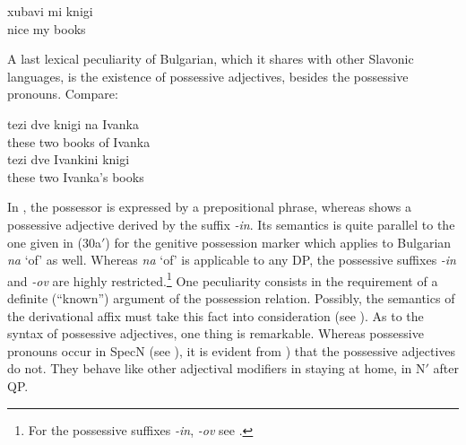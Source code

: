 \documentclass[output=paper,colorlinks,citecolor=brown]{langscibook}
\begin{document}
\ea \label{ex:zi91:43} 
    \gll \minsp{*} xubavi mi knigi \\
    {} nice my books \\
    \glt
\z

\noindent A last lexical peculiarity of Bulgarian, which it shares with other Slavonic languages, is the existence of possessive adjectives, besides the possessive pronouns. Compare:

\ea \label{ex:zi91:44}
    \ea \label{ex:zi91:44a} 
        \gll tezi dve knigi na Ivanka \\
        these two books of Ivanka \\
        \glt 
    \ex \label{ex:zi91:44b}
        \gll tezi dve Ivankini knigi \\
        these two Ivanka's books \\
        \glt
    \z
\z

\noindent In , the possessor is expressed by a prepositional phrase, whereas  shows a possessive adjective derived by the suffix \textit{-in}. Its semantics is quite parallel to the one given in (30a$'$) for the genitive possession marker which applies to Bulgarian \textit{na} `of' as well. Whereas \textit{na} `of' is applicable to any DP, the possessive suffixes \textit{-in} and \textit{-ov} are highly restricted.\footnote{For the possessive suffixes \textit{-in}, \textit{-ov} see \citet[153f.]{Tilkov83Gramatika-na-bulgarskata}.} One peculiarity consists in the requirement of a definite (“known”) argument of the possession relation. Possibly, the semantics of the derivational affix must take this fact into consideration (see \citealt{Zimmermann90Pranominale-Argument}). As to the syntax of possessive adjectives, one thing is remarkable. Whereas possessive pronouns occur in SpecN (see ), it is evident from ) that the possessive adjectives do not. They behave like other adjectival modifiers in staying at home, in N$'$ after QP.
\end{document}
